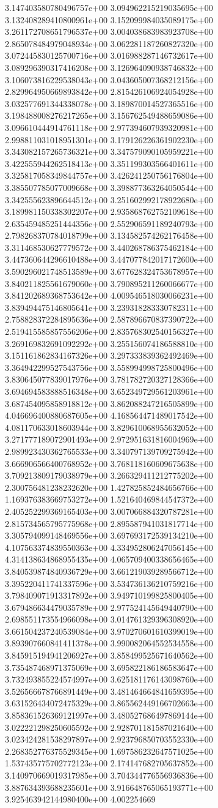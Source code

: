 3.147403580780496757e+00	3.094962215219035695e+00	3.132408289410800961e+00	3.152099984035089175e+00	3.261172708651796537e+00	3.004038683983923708e+00	2.865078484979048934e+00	3.062281187260827320e+00	3.072445830125700716e+00	3.016988287146732617e+00	3.089296390317416208e+00	3.126964090938746832e+00	3.106073816229538043e+00	3.043605007368212156e+00	2.829964950669893842e+00	2.815426106924054928e+00	3.032577691344338078e+00	3.189870014527365516e+00	3.198488008276217265e+00	3.156762549488659086e+00	3.096610444914761118e+00	2.977394607939320981e+00	2.998811031018951301e+00	3.179126226361902230e+00	3.343082157265736321e+00	3.347579090105959221e+00	3.422555944262518413e+00	3.351199303566401611e+00	3.325817058349844757e+00	3.426241250756176804e+00	3.385507785077009668e+00	3.398877363264050544e+00	3.342555623896644512e+00	3.251602992178922680e+00	3.189981150338302207e+00	2.935868762752109618e+00	2.635459485251444356e+00	2.552906591189240793e+00	2.798268370784018799e+00	3.134582574262176458e+00	3.311468530627779572e+00	3.440268786375462184e+00	3.447360644296610488e+00	3.447077842017172600e+00	3.590296021748513589e+00	3.677628324753678957e+00	3.840211825561679060e+00	3.790895211260066677e+00	3.841202689368753642e+00	4.009546518030066231e+00	3.839494475146805641e+00	3.239318283330782311e+00	2.758828372284895636e+00	2.587896670837390722e+00	2.519415585857556206e+00	2.835768302540156327e+00	3.269169832691092292e+00	3.255156074186588810e+00	3.151161862834167326e+00	3.297333839362492469e+00	3.364942299527543756e+00	3.558994998725800496e+00	3.830645077839017976e+00	3.781782720327128366e+00	3.694694583888516348e+00	3.652349729561203961e+00	3.687454095858918812e+00	3.862088247216505899e+00	4.046696400880687605e+00	4.168564471489017542e+00	4.081170633018603944e+00	3.829610068955632052e+00	3.271777189072901493e+00	2.972951631816004969e+00	2.989923430362765533e+00	3.340797139709275942e+00	3.666906566400768952e+00	3.768118160609675638e+00	3.709213809179038979e+00	3.266329411212775202e+00	2.300756481238232620e+00	1.427825852484656766e+00	1.169376383669753272e+00	1.521640469844547372e+00	2.405252299369165403e+00	3.007066884320787281e+00	2.815734565795775968e+00	2.895587941031817714e+00	3.305794099148469556e+00	3.697693172539134210e+00	4.107563374839550363e+00	4.334952806247056145e+00	4.314138634868955435e+00	4.065709400338656465e+00	3.840539874840936729e+00	3.661219039289566712e+00	3.395220411741337596e+00	3.534736136210759216e+00	3.798409071913317892e+00	3.949710199825800405e+00	3.679486634479035789e+00	2.977524145649440790e+00	2.698551173554966098e+00	3.014761329396308920e+00	3.661504237240539084e+00	3.970270601610399019e+00	3.893907660841411378e+00	3.990082064552534558e+00	3.845915194941206927e+00	3.858499525671640562e+00	3.735487468971375069e+00	3.695822186186583647e+00	3.732493855224574997e+00	3.625181176143098760e+00	3.526566678766891449e+00	3.481464664841659395e+00	3.631526434072475329e+00	3.865562449166702663e+00	3.858361526369121997e+00	3.480527686497869144e+00	3.022221298250605592e+00	2.928701181587021640e+00	3.023424281538297897e+00	2.923796850703552330e+00	2.268352776375529345e+00	1.697586232647571025e+00	1.537435775702772123e+00	2.174147682705637852e+00	3.140970669019317985e+00	3.704344776556936836e+00	3.887634393688235601e+00	3.916648765065193771e+00	3.925463942144980400e+00	4.002254669